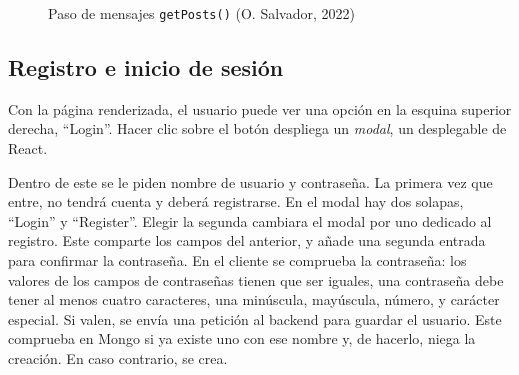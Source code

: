 \documentclass[11pt]{article}
\begin{document}
\begin{flushleft}
	
		\begin{figure}[htb]
			\centering
			\caption{Paso de mensajes \texttt{getPosts()} (O. Salvador, 2022)}
		\end{figure}
	
	\bigskip
	\bigskip
		
	\subsection{Registro e inicio de sesión}
	Con la página renderizada, el usuario puede ver una opción en la esquina superior derecha, ``Login''. Hacer clic sobre el botón despliega un \textit{modal}, un desplegable de React. 
	\linebreak
	
	Dentro de este se le piden nombre de usuario y contraseña. La primera vez que entre, no tendrá cuenta y deberá registrarse. En el modal hay dos solapas, ``Login'' y ``Register''. Elegir la segunda cambiara el modal por uno dedicado al registro. Este comparte los campos del anterior, y añade una segunda entrada para confirmar la contraseña. En el cliente se comprueba la contraseña: los valores de los campos de contraseñas tienen que ser iguales, una contraseña debe tener al menos cuatro caracteres, una minúscula, mayúscula, número, y carácter especial. Si valen, se envía una petición al backend para guardar el usuario. Este comprueba en Mongo si ya existe uno con ese nombre y, de hacerlo, niega la creación. En caso contrario, se crea.
	\linebreak
	

\end{flushleft}
\end{document}
